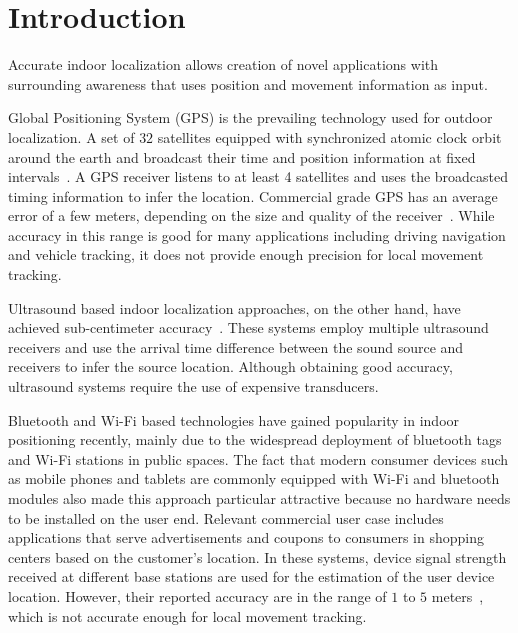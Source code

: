 \chapter{Introduction}

Accurate indoor localization allows creation of novel applications with surrounding awareness that uses position and movement information as input. 

Global Positioning System (GPS) is the prevailing technology used for outdoor localization. A set of $32$ satellites equipped with synchronized atomic clock orbit around the earth and broadcast their time and position information at fixed intervals~\cite{intro:gps2}. A GPS receiver listens to at least 4 satellites and uses the broadcasted timing information to infer the location. Commercial grade GPS has an average error of a few meters, depending on the size and quality of the receiver~\cite{intro:gps}. While accuracy in this range is good for many applications including driving navigation and vehicle tracking, it does not provide enough precision for local movement tracking. 

Ultrasound based indoor localization approaches, on the other hand, have achieved sub-centimeter accuracy~\cite{intro:ultra, intro:ultra2}. These systems employ multiple ultrasound receivers and use the arrival time difference between the sound source and receivers to infer the source location. Although obtaining good accuracy, ultrasound systems require the use of expensive transducers.

Bluetooth and Wi-Fi based technologies have gained popularity in indoor positioning recently, mainly due to the widespread deployment of bluetooth tags and Wi-Fi stations in public spaces. The fact that modern consumer devices such as mobile phones and tablets are commonly equipped with Wi-Fi and bluetooth modules also made this approach particular attractive because no hardware needs to be installed on the user end. Relevant commercial user case includes applications that serve advertisements and coupons to consumers in shopping centers based on the customer's location. In these systems, device signal strength received at different base stations are used for the estimation of the user device location. However, their reported accuracy are in the range of $1$ to $5$ meters~\cite{intro:blue, intro:loc, intro:wifi}, which is not accurate enough for local movement tracking.

